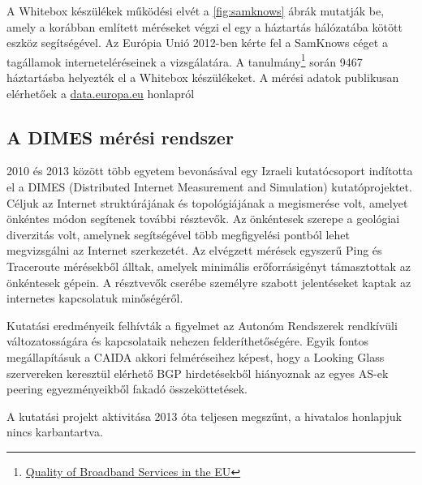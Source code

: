 A Whitebox készülékek működési elvét a \ref{fig:samknows} ábrák mutatják be, amely a korábban említett méréseket végzi el egy a háztartás hálózatába kötött eszköz segítségével. Az Európia Unió 2012-ben kérte fel a SamKnows céget a tagállamok interneteléréseinek a vizsgálatára. A tanulmány\footnote{\href{https://ec.europa.eu/digital-single-market/news/quality-broadband-services-eu-samknows-study-internet-speeds}{Quality of Broadband Services in the EU}} során 9467 háztartásba helyezték el a Whitebox készülékeket. A mérési adatok publikusan elérhetőek a \url{data.europa.eu} honlapról


\subsection{A DIMES mérési rendszer}

2010 és 2013 között több egyetem bevonásával egy Izraeli kutatócsoport indította el a DIMES (Distributed Internet Measurement and Simulation) kutatóprojektet. Céljuk az Internet struktúrájának és topológiájának a megismerése volt, amelyet önkéntes módon segítenek további résztevők.
Az önkéntesek szerepe a geológiai diverzitás volt, amelynek segítségével több megfigyelési pontból lehet megvizsgálni az Internet szerkezetét.
Az elvégzett mérések egyszerű Ping és Traceroute mérésekből álltak, amelyek minimális erőforrásigényt támasztottak az önkéntesek gépein. A résztvevők cserébe személyre szabott jelentéseket kaptak az internetes kapcsolatuk minőségéről.

Kutatási eredményeik felhívták a figyelmet az Autonóm Rendszerek rendkívüli változatosságára és kapcsolataik nehezen felderíthetőségére. Egyik fontos megállapításuk a CAIDA akkori felméréseihez képest, hogy a Looking Glass szervereken keresztül elérhető BGP hirdetésekből hiányoznak az egyes AS-ek peering egyezményeikből fakadó összeköttetések.

A kutatási projekt aktivitása 2013 óta teljesen megszűnt, a hivatalos honlapjuk nincs karbantartva.


